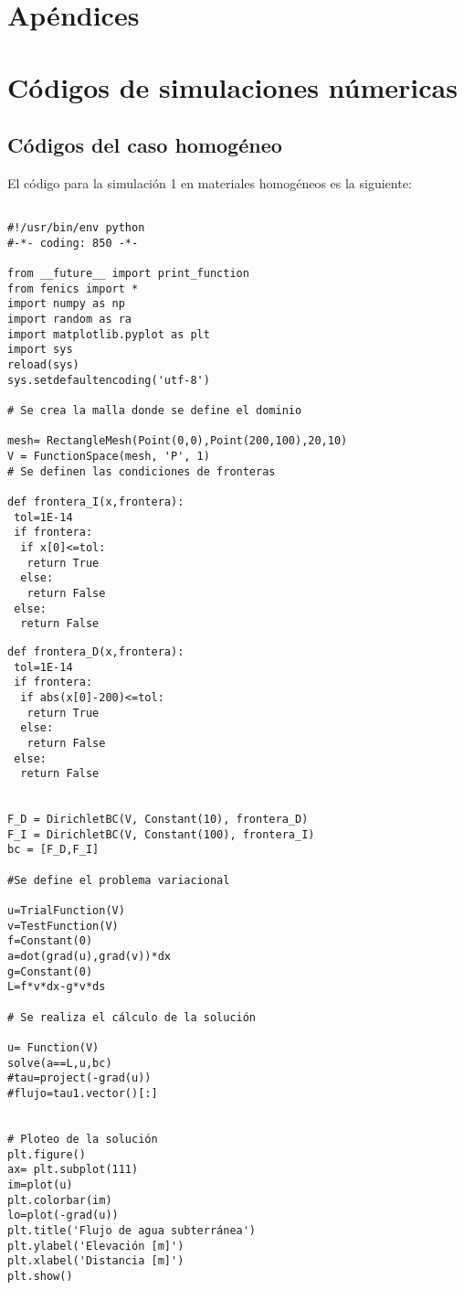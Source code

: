 \chapter*{Apéndices}
\appendix
\chapter{Códigos de simulaciones númericas}
\section{Códigos del caso homogéneo}
El código para la simulación 1 en materiales homogéneos es la siguiente:


\begin{lstlisting}[frame=single]

#!/usr/bin/env python
#-*- coding: 850 -*-

from __future__ import print_function
from fenics import *
import numpy as np
import random as ra
import matplotlib.pyplot as plt
import sys
reload(sys)
sys.setdefaultencoding('utf-8')

# Se crea la malla donde se define el dominio

mesh= RectangleMesh(Point(0,0),Point(200,100),20,10)
V = FunctionSpace(mesh, 'P', 1)
# Se definen las condiciones de fronteras

def frontera_I(x,frontera):
 tol=1E-14    
 if frontera:
  if x[0]<=tol: 
   return True
  else:
   return False 
 else:
  return False  

\end{lstlisting}

\newpage

\begin{lstlisting}[frame=single]
def frontera_D(x,frontera):
 tol=1E-14    
 if frontera:
  if abs(x[0]-200)<=tol: 
   return True
  else:
   return False 
 else:
  return False  


F_D = DirichletBC(V, Constant(10), frontera_D)
F_I = DirichletBC(V, Constant(100), frontera_I)
bc = [F_D,F_I]

#Se define el problema variacional

u=TrialFunction(V)
v=TestFunction(V)
f=Constant(0)
a=dot(grad(u),grad(v))*dx
g=Constant(0)
L=f*v*dx-g*v*ds

# Se realiza el cálculo de la solución

u= Function(V)
solve(a==L,u,bc)
#tau=project(-grad(u))
#flujo=tau1.vector()[:] 


# Ploteo de la solución
plt.figure()
ax= plt.subplot(111)  
im=plot(u)
plt.colorbar(im) 
lo=plot(-grad(u))
plt.title('Flujo de agua subterránea')
plt.ylabel('Elevación [m]')
plt.xlabel('Distancia [m]')
plt.show()

\end{lstlisting}



